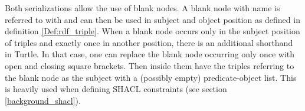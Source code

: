     Both serializations allow the use of blank nodes. A blank node with name  is referred to with  and can then be used in subject and object position as defined in definition \ref{Def:rdf_triple}.
    When a blank node occurs only in the subject position of triples \uri{[(\_:b,p1,o1),(\_:b,p2,o2),...]} and exactly once in another position, there is an additional shorthand in Turtle. In that case, one can replace the blank node occurring only once with open and closing square brackets. Then inside them have the triples referring to the blank node as the subject with a (possibly empty) predicate-object list. This is heavily used when defining SHACL constraints (see section \ref{background_shacl}). %
    
